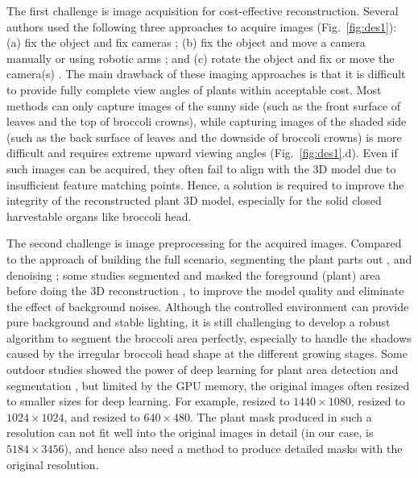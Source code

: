 The first challenge is image acquisition for cost-effective reconstruction. Several authors used the following three approaches to acquire images (Fig.~\ref{fig:des1}): (a) fix the object and fix cameras \citep{nguyen_structured_2015}; (b) fix the object and move a camera manually \citep{xiao_image-based_2020} or using robotic arms \citep{cao_quantifying_2019,nguyen_3d_2016}; and (c) rotate the object and fix or move the camera(s) \citep{kochi_3d_2018,gao_novel_2021}. The main drawback of these imaging approaches is that it is difficult to provide fully complete view angles of plants within acceptable cost. Most methods can only capture images of the sunny side (such as the front surface of leaves and the top of broccoli crowns), while capturing images of the shaded side (such as the back surface of leaves and the downside of broccoli crowns) is more difficult and requires extreme upward viewing angles (Fig.~\ref{fig:des1}.d). Even if such images can be acquired, they often fail to align with the 3D model due to insufficient feature matching points. Hence, a solution is required to improve the integrity of the reconstructed plant 3D model, especially for the solid closed harvestable organs like broccoli head.

The second challenge is image preprocessing for the acquired images. Compared to the approach of building the full scenario, segmenting the plant parts out \citep{ge_method_2019}, and denoising \citep{wu_mvs-pheno_2020}; some studies segmented and masked the foreground (plant) area before doing the 3D reconstruction \citep{nguyen_3d_2016,kochi_3d_2018}, to improve the model quality and eliminate the effect of background noises. Although the controlled environment can provide pure background and stable lighting, it is still challenging to develop a robust algorithm to segment the broccoli area perfectly, especially to handle the shadows caused by the irregular broccoli head shape at the different growing stages. Some outdoor studies showed the power of deep learning for plant area detection and segmentation \citep{zhou_monitoring_2020,blok_effect_2021,garcia_towards_2021}, but limited by the GPU memory, the original images often resized to smaller sizes for deep learning. For example, \citet{zhou_monitoring_2020} resized to $1440 \times 1080$, \citet{blok_effect_2021} resized to $1024 \times 1024$, and \citet{garcia_towards_2021} resized to $640 \times 480$. The plant mask produced in such a resolution can not fit well into the original images in detail (in our case, is $5184 \times 3456$), and hence also need a method to produce detailed masks with the original resolution.

